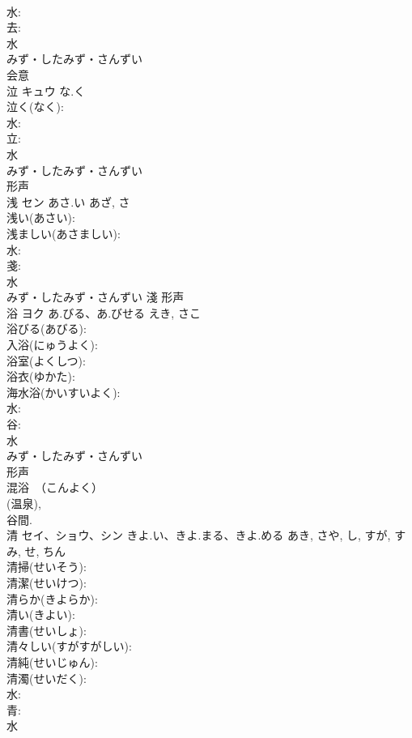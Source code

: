 \documentclass[8pt]{extreport}
\begin{document}
\begin{CJK}{UTF8}{min}
\\	水: 
\\	去: 
\\	水	
\\	みず・したみず・さんずい	
\\	会意 
\\	泣	キュウ	な.く		
\\	泣く(なく): 
\\	水: 
\\	立: 
\\	水	
\\	みず・したみず・さんずい	
\\	形声 
\\	浅	セン	あさ.い	あざ, さ	
\\	浅い(あさい): 
\\	浅ましい(あさましい): 
\\	水: 
\\	戔: 
\\	水	
\\	みず・したみず・さんずい	淺	形声 
\\	浴	ヨク	あ.びる、あ.びせる	えき, さこ	
\\	浴びる(あびる): 
\\	入浴(にゅうよく): 
\\	浴室(よくしつ): 
\\	浴衣(ゆかた): 
\\	海水浴(かいすいよく): 
\\	水: 
\\	谷: 
\\	水	
\\	みず・したみず・さんずい	
\\	形声 
\\	混浴　（こんよく） 
\\	(温泉), 
\\	谷間.	
\\	清	セイ、ショウ、シン	きよ.い、きよ.まる、きよ.める	あき, さや, し, すが, すみ, せ, ちん	
\\	清掃(せいそう): 
\\	清潔(せいけつ): 
\\	清らか(きよらか): 
\\	清い(きよい): 
\\	清書(せいしょ): 
\\	清々しい(すがすがしい): 
\\	清純(せいじゅん): 
\\	清濁(せいだく): 
\\	水: 
\\	青: 
\\	水	

\end{CJK}
\end{document}
